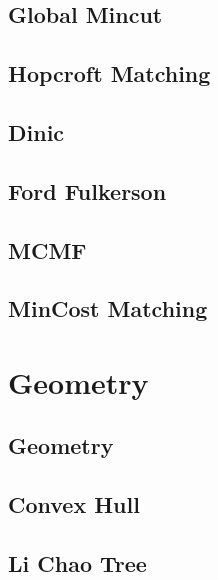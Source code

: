 \subsection{Global Mincut}
\raggedbottom
\subsection{Hopcroft Matching}
\raggedbottom
\subsection{Dinic}
\raggedbottom
\subsection{Ford Fulkerson}
\raggedbottom
\subsection{MCMF}
\raggedbottom
\subsection{MinCost Matching}
\raggedbottom

\section{Geometry}
\subsection{Geometry}
\raggedbottom
\subsection{Convex Hull}
\raggedbottom
\subsection{Li Chao Tree}
\raggedbottom
